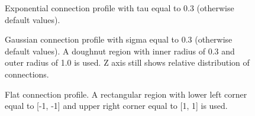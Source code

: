 \documentclass[landscape]{article}
\begin{document}
\clearpage


\begin{figure}[B]
\caption{Exponential connection profile with tau equal to 0.3 (otherwise default values).}
\end{figure}

\clearpage


\begin{figure}[B]
\caption{Gaussian connection profile with sigma equal to 0.3 (otherwise default values). A doughnut region with inner radius of 0.3 and outer radius of 1.0 is used. Z axis still shows relative distribution of connections.}
\end{figure}

\clearpage


\begin{figure}[B]
\caption{Flat connection profile. A rectangular region with lower left corner equal to [-1, -1] and upper right corner equal to [1, 1] is used.}
\end{figure}
\end{document}
